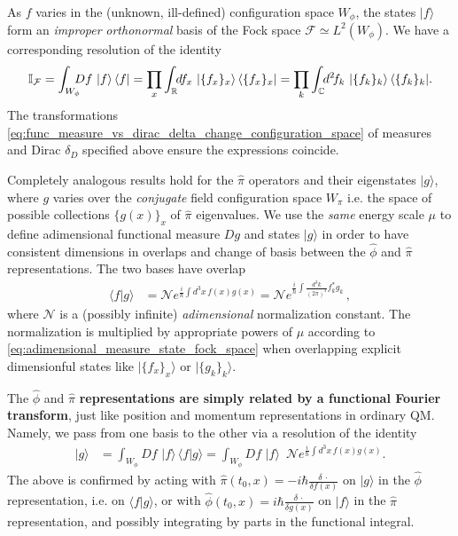 \documentclass[../QFT_main.tex]{subfiles}
\begin{document}
\begin{mytheorem}
\begin{align}
\end{align}
%
As $f$ varies in the (unknown, ill-defined) configuration space $W_{\phi}$, the states $|f\rangle$ form an \emph{improper} \emph{orthonormal} basis of the Fock space $\mathcal{F}\simeq L^2(W_{\phi})$.
We have a corresponding resolution of the identity 
\begin{align}
    \mathbb{I}_{\mathcal{F}}= \int_{W_{\phi}} \!\!\!\!Df\, \, |f \rangle \,\langle f |
     = \prod_x \int_\R \!\!df_x \,\, |\{f_x\}_x \rangle\, \langle \{f_x\}_x | 
     = \prod_k \int_{\C} \!\!d^2\!f_k\, \, |\{f_k\}_k \rangle \,\langle \{f_k\}_k |.
\end{align}
The transformations \eqref{eq:func_measure_vs_dirac_delta_change_configuration_space} of measures and Dirac $\delta_D$ specified above ensure the expressions coincide.
%

Completely analogous results hold for the $\hat{\pi}$ operators and their eigenstates $|g\rangle$, where $g$ varies over the \emph{conjugate} field configuration space $W_{\pi}$ i.e. the space of possible collections $\{g(x)\}_x$ of $\hat{\pi}$ eigenvalues.
We use the \emph{same} energy scale $\mu$ to define adimensional functional measure $Dg$ and states $|g\rangle$ in order to have consistent dimensions in overlaps and change of basis between the $\hat{\phi}$ and $\hat{\pi}$ representations.
%
The two bases have overlap
\begin{align}
    \langle f | g \rangle &= \mathcal{N} e^{\frac{i}{\hbar} \int d^3 x\, f(x) g(x)} = \mathcal{N} e^{\frac{i}{\hbar} \int \frac{d^3 k}{(2\pi)^3} f_k^* g_{k}}\,,
\end{align}
where $\mathcal{N}$ is a (possibly infinite) \emph{adimensional} normalization constant. 
The normalization is multiplied by appropriate powers of $\mu$ according to \eqref{eq:adimensional_measure_state_fock_space} when overlapping explicit dimensionful states like $|\{f_x\}_x\rangle$ or $|\{g_k\}_k\rangle$.

The $\hat{\phi}$ and $\hat{\pi}$ \textbf{representations are simply related by a functional Fourier transform}, just like position and momentum representations in ordinary QM.
Namely, we pass from one basis to the other via a resolution of the identity
\begin{align}
    |g\rangle &= \int_{W_{\phi}}\!\!\! Df\,\, |f\rangle\, \langle f | g \rangle
    = \int_{W_{\phi}}\!\!\! Df\,\, |f\rangle\, \,\,\mathcal{N} e^{\frac{i}{\hbar} \int d^3 x\, f(x) g(x)}.
\end{align}
%
The above is confirmed by acting with $\hat{\pi}(t_0,x)=-i\hbar\frac{\delta\,\cdot}{\delta f(x)}$ on $|g\rangle$ in the $\hat{\phi}$representation, i.e. on $\langle f | g\rangle$, or with $\hat{\phi}(t_0,x)=i\hbar\frac{\delta\,\cdot}{\delta g(x)}$ on $|f\rangle$ in the $\hat{\pi}$ representation, and possibly integrating by parts in the functional integral.
%



\end{mytheorem}
\end{document}
